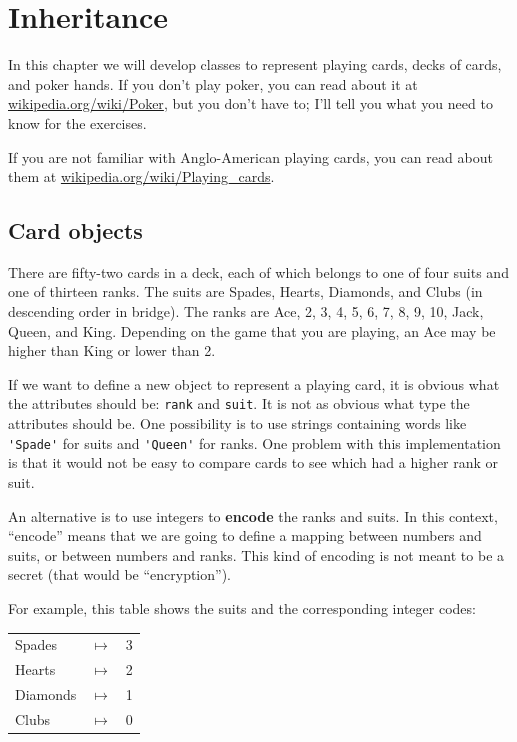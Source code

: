 \chapter{Inheritance}

In this chapter we will develop classes to represent playing cards,
decks of cards, and poker hands.  If you don't play poker, you can
read about it at \url{wikipedia.org/wiki/Poker}, but you don't have
to; I'll tell you what you need to know for the exercises.


If you are not familiar with Anglo-American playing cards,
you can read about them at \url{wikipedia.org/wiki/Playing_cards}.


\section{Card objects}

There are fifty-two cards in a deck, each of which belongs to one of
four suits and one of thirteen ranks.  The suits are Spades, Hearts,
Diamonds, and Clubs (in descending order in bridge).  The ranks are
Ace, 2, 3, 4, 5, 6, 7, 8, 9, 10, Jack, Queen, and King.  Depending on
the game that you are playing, an Ace may be higher than King
or lower than 2.


If we want to define a new object to represent a playing card, it is
obvious what the attributes should be: {\tt rank} and
{\tt suit}.  It is not as obvious what type the attributes
should be.  One possibility is to use strings containing words like
\verb"'Spade'" for suits and \verb"'Queen'" for ranks.  One problem with
this implementation is that it would not be easy to compare cards to
see which had a higher rank or suit.


An alternative is to use integers to {\bf encode} the ranks and suits.
In this context, ``encode'' means that we are going to define a mapping
between numbers and suits, or between numbers and ranks.  This
kind of encoding is not meant to be a secret (that
would be ``encryption'').

For example, this table shows the suits and the corresponding integer
codes:

\beforefig
\begin{tabular}{l c l}
Spades & $\mapsto$ & 3 \\
Hearts & $\mapsto$ & 2 \\
Diamonds & $\mapsto$ & 1 \\
Clubs & $\mapsto$ & 0
\end{tabular}
\afterfig

